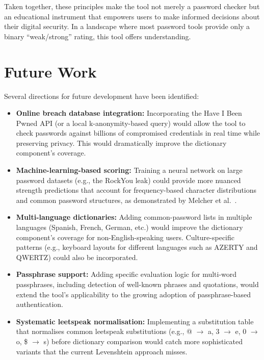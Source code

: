Taken together, these principles make the tool not merely a password checker but an educational instrument that empowers users to make informed decisions about their digital security. In a landscape where most password tools provide only a binary ``weak/strong'' rating, this tool offers understanding.

\clearpage

\section{Future Work}

Several directions for future development have been identified:

\begin{itemize}
    \item \textbf{Online breach database integration:} Incorporating the Have I Been Pwned API (or a local k-anonymity-based query) would allow the tool to check passwords against billions of compromised credentials in real time while preserving privacy. This would dramatically improve the dictionary component's coverage.

    \item \textbf{Machine-learning-based scoring:} Training a neural network on large password datasets (e.g., the RockYou leak) could provide more nuanced strength predictions that account for frequency-based character distributions and common password structures, as demonstrated by Melcher et al.\ \cite{melcher2016}.

    \item \textbf{Multi-language dictionaries:} Adding common-password lists in multiple languages (Spanish, French, German, etc.) would improve the dictionary component's coverage for non-English-speaking users. Culture-specific patterns (e.g., keyboard layouts for different languages such as AZERTY and QWERTZ) could also be incorporated.

    \item \textbf{Passphrase support:} Adding specific evaluation logic for multi-word passphrases, including detection of well-known phrases and quotations, would extend the tool's applicability to the growing adoption of passphrase-based authentication.

    \item \textbf{Systematic leetspeak normalisation:} Implementing a substitution table that normalises common leetspeak substitutions (e.g., @ $\to$ a, 3 $\to$ e, 0 $\to$ o, \$ $\to$ s) before dictionary comparison would catch more sophisticated variants that the current Levenshtein approach misses.


\end{itemize}

